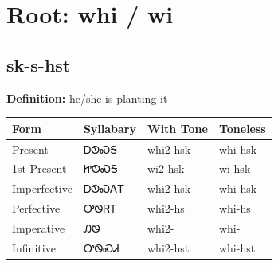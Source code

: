 \documentclass{article}%
\begin{document}
%
\normalsize%
\section*{Root: whi / wi}%
\subsection*{sk-s-hst}%
\textbf{Definition: }%
he/she is planting it%
\\[0.5em]%
\begin{tabular}{|l|l|l|l|}%
\hline%
\textbf{Form}&\textbf{Syllabary}&\textbf{With Tone}&\textbf{Toneless}\\%
\hline%
Present&ᎠᏫᏍᎦ&whi2{-}hsk&whi{-}hsk\\%
1st Present&ᏥᏫᏍᎦ&wi2{-}hsk&wi{-}hsk\\%
Imperfective&ᎠᏫᏍᎪᎢ&whi2{-}hsk&whi{-}hsk\\%
Perfective&ᎤᏫᏒᎢ&whi2{-}hs&whi{-}hs\\%
Imperative&ᎯᏫ&whi2{-}&whi{-}\\%
Infinitive&ᎤᏫᏍᏗ&whi2{-}hst&whi{-}hst\\%
\hline%
\end{tabular}%
\\[1em]%
\end{document}
